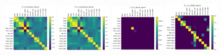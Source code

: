 \begin{figure}
    \centering
    \includegraphics[width=0.24\textwidth]{diss/7_cond/figs/T1_2.0_Pearson_Result.png}
    \includegraphics[width=0.24\textwidth]{diss/7_cond/figs/T1_2.0_Spearman_Result.png}
    \includegraphics[width=0.24\textwidth]{diss/7_cond/figs/T1_2.0_Glasso_Result.png}
    \includegraphics[width=0.24\textwidth]{diss/7_cond/figs/T1_2.0_CODEC_Result.png}
    

\end{figure}
